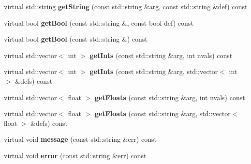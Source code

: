 \begin{DoxyCompactItemize}
virtual std\+::string {\bfseries get\+String} (const std\+::string \&arg, const std\+::string \&def) const
\item 
\mbox{\label{class_s_e_p_1_1json_generic_file_a99c2336c60f33f23009216e58395a8c9}} 
virtual bool {\bfseries get\+Bool} (const std\+::string \&, const bool def) const
\item 
\mbox{\label{class_s_e_p_1_1json_generic_file_a9921a47c0d91a50bb078785e1ed942dd}} 
virtual bool {\bfseries get\+Bool} (const std\+::string \&) const
\item 
\mbox{\label{class_s_e_p_1_1json_generic_file_a72f5a682a02ec603c5c17ae394520904}} 
virtual std\+::vector$<$ int $>$ {\bfseries get\+Ints} (const std\+::string \&arg, int nvals) const
\item 
\mbox{\label{class_s_e_p_1_1json_generic_file_ac1694bfb88aedc0bf2523e2e88d320ea}} 
virtual std\+::vector$<$ int $>$ {\bfseries get\+Ints} (const std\+::string \&arg, std\+::vector$<$ int $>$ \&defs) const
\item 
\mbox{\label{class_s_e_p_1_1json_generic_file_a2c369e86d6b9fe35087ebb9283d19480}} 
virtual std\+::vector$<$ float $>$ {\bfseries get\+Floats} (const std\+::string \&arg, int nvals) const
\item 
\mbox{\label{class_s_e_p_1_1json_generic_file_aba2bcf10465df729322db0ebc7d86dc3}} 
virtual std\+::vector$<$ float $>$ {\bfseries get\+Floats} (const std\+::string \&arg, std\+::vector$<$ float $>$ \&defs) const
\item 
\mbox{\label{class_s_e_p_1_1json_generic_file_a53a38ab97a7907c3f15df2e3f1c77c22}} 
virtual void {\bfseries message} (const std\+::string \&err) const
\item 
\mbox{\label{class_s_e_p_1_1json_generic_file_a1c289183f30b9e0507a455dde03f97ca}} 
virtual void {\bfseries error} (const std\+::string \&err) const
\item 
\mbox{\label{class_s_e_p_1_1json_generic_file_aecb9b0754d3444bd09d9a5a0a0bd38d1}} 

\end{DoxyCompactItemize}
